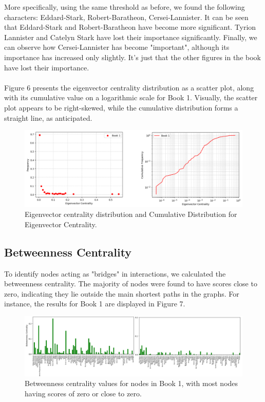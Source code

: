 \documentclass[12pt, a4paper]{article}
\begin{document}
More specifically, using the same threshold as before, we found the following characters: Eddard-Stark, Robert-Baratheon, Cersei-Lannister. It can be seen that Eddard-Stark and Robert-Baratheon have become more significant. Tyrion Lannister and Catelyn Stark have lost their importance significantly. Finally, we can observe how Cersei-Lannister has become "important", although its importance has increased only slightly. It's just that the other figures in the book have lost their importance.
\\\\Figure 6 presents the eigenvector centrality distribution as a scatter plot, along with its cumulative value on a logarithmic scale for Book 1. Visually, the scatter plot appears to be right-skewed, while the cumulative distribution forms a straight line, as anticipated.

\begin{figure}[H]
    \centering
    \includegraphics[width=1\linewidth]{Eigenvector centrality distribution and Cumulative Distribution for Eigenvector Centrality.png}
    \caption{Eigenvector centrality distribution and Cumulative Distribution for Eigenvector Centrality.}
    \label{fig:enter-label}
\end{figure}

\subsection{Betweenness Centrality}
\label{betweenness centrality}
To identify nodes acting as "bridges" in interactions, we calculated the betweenness centrality. The majority of nodes were found to have scores close to zero, indicating they lie outside the main shortest paths in the graphs. For instance, the results for Book 1 are displayed in Figure 7.

\begin{figure}[H]
    \centering
    \includegraphics[width=1\linewidth]{Betweenness centrality.png}
    \caption{Betweenness centrality values for nodes in Book 1, with most nodes having scores of zero or close to zero.}
    \label{fig:enter-label}
\end{figure}
\end{document}
